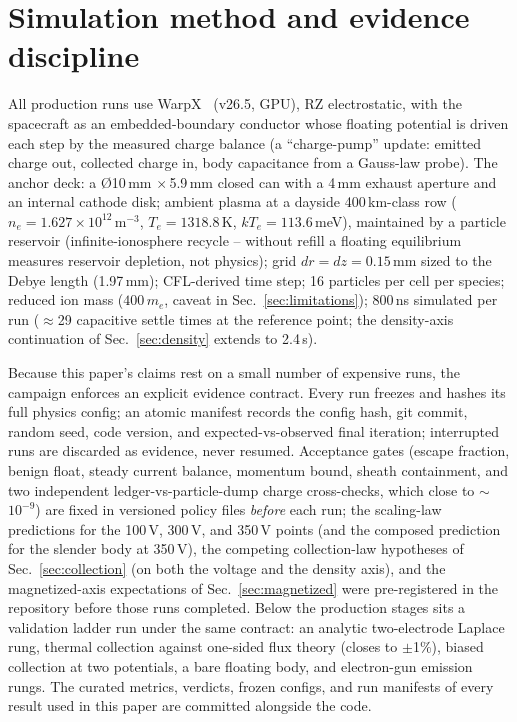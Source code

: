 \documentclass[11pt]{article}
\begin{document}
\section{Simulation method and evidence discipline}
\label{sec:method}
All production runs use WarpX~\cite{warpx22} (v26.5, GPU), RZ electrostatic,
with the spacecraft as an embedded-boundary conductor whose floating
potential is driven each step by the measured charge balance (a
``charge-pump'' update: emitted charge out, collected charge in, body
capacitance from a Gauss-law probe). The anchor deck: a \O10\,mm
$\times$\,5.9\,mm closed can with a 4\,mm exhaust aperture and an internal
cathode disk; ambient plasma at a dayside 400\,km-class row
($n_e = 1.627\times10^{12}$\,m$^{-3}$, $T_e = 1318.8$\,K,
$kT_e = 113.6$\,meV), maintained by a particle reservoir (infinite-ionosphere
recycle -- without refill a floating equilibrium measures reservoir
depletion, not physics); grid $dr = dz = 0.15$\,mm sized to the Debye length
(1.97\,mm); CFL-derived time step; 16 particles per cell per species;
reduced ion mass ($400\,m_e$, caveat in Sec.~\ref{sec:limitations});
800\,ns simulated per run ($\approx$29 capacitive settle times at the
reference point; the density-axis continuation of Sec.~\ref{sec:density}
extends to 2.4\,\textmu s).

Because this paper's claims rest on a small number of expensive runs, the
campaign enforces an explicit evidence contract. Every run freezes and
hashes its full physics config; an atomic manifest records the config hash,
git commit, random seed, code version, and expected-vs-observed final
iteration; interrupted runs are discarded as evidence, never resumed.
Acceptance gates (escape fraction, benign float, steady current balance,
momentum bound, sheath containment, and two independent ledger-vs-particle-dump
charge cross-checks, which close to $\sim$$10^{-9}$) are fixed in versioned
policy files \emph{before} each run; the scaling-law predictions for the
100\,V, 300\,V, and 350\,V points (and the composed prediction for the
slender body at 350\,V), the competing collection-law hypotheses of
Sec.~\ref{sec:collection} (on both the voltage and the density axis),
and the magnetized-axis expectations of Sec.~\ref{sec:magnetized} were
pre-registered in the repository before those runs completed. Below the production stages sits a validation ladder
run under the same contract: an analytic two-electrode Laplace rung, thermal
collection against one-sided flux theory (closes to $\pm$1\%), biased
collection at two potentials, a bare floating body, and electron-gun
emission rungs. The curated metrics, verdicts, frozen configs, and run
manifests of every result used in this paper are committed alongside the
code.
\end{document}
